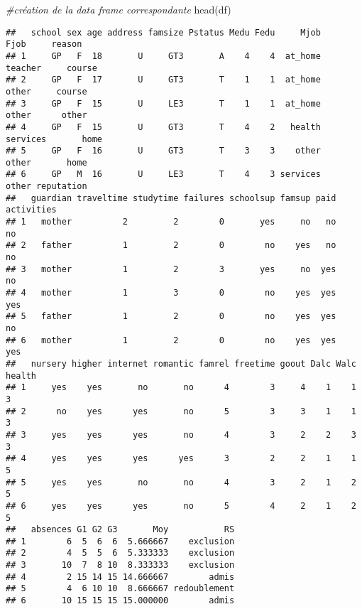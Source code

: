 \documentclass[
]{article}
\newenvironment{Shaded}{\begin{snugshade}}{\end{snugshade}}
\newcommand{\CommentTok}[1]{\textcolor[rgb]{0.56,0.35,0.01}{\textit{#1}}}
\newcommand{\DecValTok}[1]{\textcolor[rgb]{0.00,0.00,0.81}{#1}}
\newcommand{\FunctionTok}[1]{\textcolor[rgb]{0.00,0.00,0.00}{#1}}
\newcommand{\NormalTok}[1]{#1}
\newcommand{\OtherTok}[1]{\textcolor[rgb]{0.56,0.35,0.01}{#1}}
\newcommand{\SpecialCharTok}[1]{\textcolor[rgb]{0.00,0.00,0.00}{#1}}
\begin{document}
\begin{Shaded}
\begin{Highlighting}[]
\CommentTok{\#création de la data frame correspondante}
\FunctionTok{head}\NormalTok{(df)}
\end{Highlighting}
\end{Shaded}

\begin{verbatim}
##   school sex age address famsize Pstatus Medu Fedu     Mjob     Fjob     reason
## 1     GP   F  18       U     GT3       A    4    4  at_home  teacher     course
## 2     GP   F  17       U     GT3       T    1    1  at_home    other     course
## 3     GP   F  15       U     LE3       T    1    1  at_home    other      other
## 4     GP   F  15       U     GT3       T    4    2   health services       home
## 5     GP   F  16       U     GT3       T    3    3    other    other       home
## 6     GP   M  16       U     LE3       T    4    3 services    other reputation
##   guardian traveltime studytime failures schoolsup famsup paid activities
## 1   mother          2         2        0       yes     no   no         no
## 2   father          1         2        0        no    yes   no         no
## 3   mother          1         2        3       yes     no  yes         no
## 4   mother          1         3        0        no    yes  yes        yes
## 5   father          1         2        0        no    yes  yes         no
## 6   mother          1         2        0        no    yes  yes        yes
##   nursery higher internet romantic famrel freetime goout Dalc Walc health
## 1     yes    yes       no       no      4        3     4    1    1      3
## 2      no    yes      yes       no      5        3     3    1    1      3
## 3     yes    yes      yes       no      4        3     2    2    3      3
## 4     yes    yes      yes      yes      3        2     2    1    1      5
## 5     yes    yes       no       no      4        3     2    1    2      5
## 6     yes    yes      yes       no      5        4     2    1    2      5
##   absences G1 G2 G3       Moy           RS
## 1        6  5  6  6  5.666667    exclusion
## 2        4  5  5  6  5.333333    exclusion
## 3       10  7  8 10  8.333333    exclusion
## 4        2 15 14 15 14.666667        admis
## 5        4  6 10 10  8.666667 redoublement
## 6       10 15 15 15 15.000000        admis
\end{verbatim}

\begin{Shaded}
\end{Shaded}
\end{document}
